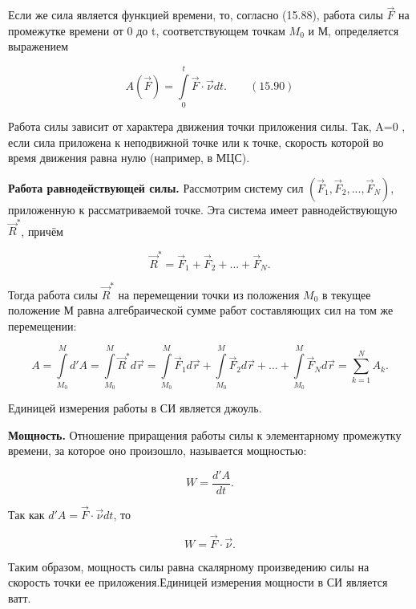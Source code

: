 {\begin{center}
	  \par Если же сила является функцией времени, то, согласно (15.88), работа силы $\vec F$ на промежутке времени от 0 до t, соответствующем точкам $M_0$ и М, определяется выражением

	  $$A(\vec F) = \int\limits_{0}^t \vec F \cdot \vec\nu dt. \qquad (15.90)$$

	  \par Работа силы зависит от характера движения точки приложения силы. Так, A=0 , если сила приложена к неподвижной точке или к точке, скорость которой во время движения равна нулю (например, в МЦС).

	  \par\textbf{Работа равнодействующей силы.} Рассмотрим систему сил $(\vec F_1,\vec F_2,...,\vec F_N)$, приложенную к рассматриваемой точке. Эта система имеет равнодействующую $\vec R^*$, причём

	  $$\vec R^* = \vec F_1 + \vec F_2 + ... + \vec F_N.$$

	  \par Тогда работа силы $\vec R^*$ на перемещении точки из положения $M_0$ в текущее положение М равна алгебраической сумме работ составляющих сил на том же перемещении:
	  
	  $$A = \int\limits_{M_0}^M d'A = \int\limits_{M_0}^M \vec R^* d \vec r = \int\limits_{M_0}^M \vec F_1 d \vec r + \int\limits_{M_0}^M \vec F_2 d \vec r + ... + \int\limits_{M_0}^M \vec F_N d \vec r = \sum\limits_{k=1}^N A_k.$$

	  \par Единицей измерения работы в СИ является джоуль.

	  \par\textbf{Мощность.} Отношение приращения работы силы к элементарному промежутку времени, за которое оно произошло, называется мощностью:
      
      $$W = \frac{d'A}{dt}.$$

	  \par Так как $d'A = \vec F \cdot \vec\nu dt$, то

	  $$W = \vec F \cdot \vec\nu.$$

	  \par Таким образом, мощность силы равна скалярному произведению силы на скорость точки ее приложения.Единицей измерения мощности в СИ является ватт.
\end{center}
}
